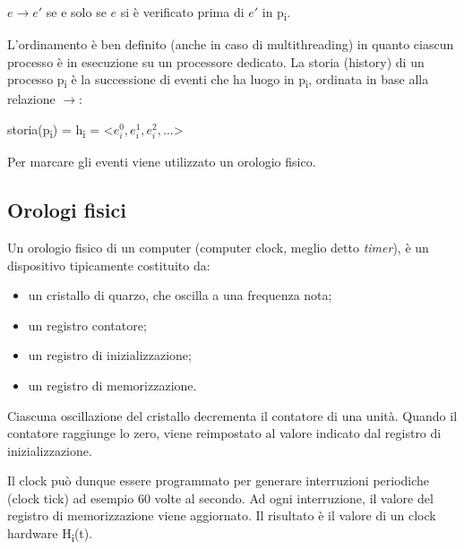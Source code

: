 \vspace{5mm}

\begin{center}
    $e \rightarrow e'$ se e solo se $e$ si è verificato prima di $e'$ in p\textsubscript{i}.
\end{center}

\vspace{5mm}

L'ordinamento è ben definito (anche in caso di multithreading) in quanto ciascun processo è in esecuzione su un processore dedicato. La storia (history) di un processo p\textsubscript{i} è la successione di eventi che ha luogo in p\textsubscript{i}, ordinata in base alla relazione $\rightarrow$:

\vspace{5mm}

\begin{center}
    storia(p\textsubscript{i}) = h\textsubscript{i} = <$e_{i}^{0}, e_{i}^{1}, e_{i}^{2}, ...$>
\end{center}

\vspace{5mm}

Per marcare gli eventi viene utilizzato un orologio fisico. 

\subsection{Orologi fisici}
Un orologio fisico di un computer (computer clock, meglio detto \textit{timer}), è un dispositivo tipicamente costituito da:
\begin{itemize}
    \item un cristallo di quarzo, che oscilla a una frequenza nota;
    \item un registro contatore;
    \item un registro di inizializzazione;
    \item un registro di memorizzazione.
\end{itemize}
Ciascuna oscillazione del cristallo decrementa il contatore di una unità. Quando il contatore raggiunge lo zero, viene reimpostato al valore indicato dal registro di inizializzazione.

Il clock può dunque essere programmato per generare interruzioni periodiche (clock tick) ad esempio 60 volte al secondo. Ad ogni interruzione, il valore del registro di memorizzazione viene aggiornato. Il risultato è il valore di un clock hardware H\textsubscript{i}(t). 

